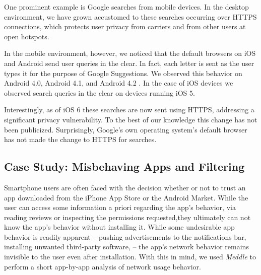 One prominent example is Google searches from mobile devices. In the 
desktop environment, we have grown accustomed to these searches 
occurring over HTTPS connections, which protects user privacy from 
carriers and from other users at open \wifi hotspots. 

In the mobile environment, however, we noticed that the default 
browsers on iOS and Android send user queries in the clear. In fact, 
each letter is sent as the user types it for the purpose of Google Suggestions. 
We
observed this behavior on Android 4.0, Android 4.1, and Android 4.2
. In the case of iOS devices we observed search queries
in the clear on devices running iOS 5. 

Interestingly, as of iOS 6 these searches are now sent using HTTPS, addressing 
a significant privacy vulnerability. To the best of our knowledge this 
change has not been publicized. Surprisingly, Google's own operating 
system's default browser has not made the change to HTTPS for searches.

%


\subsection{Case Study: Misbehaving Apps and Filtering}
\label{sec:case-study-filtering}

    Smartphone users are often faced with the decision whether or not to trust an app downloaded from the iPhone App Store or the Android Market.
    While the user can access some information a priori regarding the app's behavior, \eg{} via reading reviews or inspecting the permissions requested,they ultimately can not know the app's behavior without installing it.
    While some undesirable app behavior is readily apparent -- \eg{} pushing advertisements to the notifications bar, installing unwanted third-party software, \etc{} -- the app's network behavior remains invisible to the user even after installation.
    With this in mind, we used {\it Meddle} to perform a short app-by-app analysis of network usage behavior.
    
